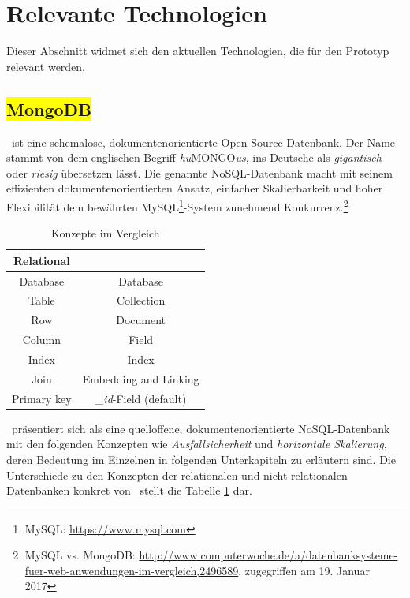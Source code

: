 \section{Relevante Technologien}

Dieser Abschnitt widmet sich den aktuellen Technologien, die für den Prototyp relevant werden.

\subsection{\colorbox{yellow}{MongoDB}}\label{mongo}

\mongo\ ist eine  schemalose, dokumentenorientierte Open-Source-Datenbank. Der Name stammt von dem englischen Begriff \textit{hu}MONGO\textit{us}, ins Deutsche als \textit{gigantisch} oder \textit{riesig} übersetzen lässt. Die genannte NoSQL-Datenbank macht mit seinem effizienten dokumentenorientierten Ansatz, einfacher Skalierbarkeit und hoher Flexibilität dem bewährten MySQL\footnote{MySQL: \url{https://www.mysql.com}}-System zunehmend Konkurrenz.\footnote{MySQL vs. MongoDB: \url{http://www.computerwoche.de/a/datenbanksysteme-fuer-web-anwendungen-im-vergleich,2496589}, zugegriffen am 19. Januar 2017} 


\newcommand*{\head}[1]{\textbf{#1}}%

\begin{table}[h]
\centering
\begin{tabular}{cc}
\toprule 
    \rowcolor{gray!50}
	Relational & \mongo\ \\
	\midrule
	Database &  Database\\
	Table & Collection\\
	Row &  Document\\
	Column &  Field\\
	Index & Index\\
	Join &  Embedding and Linking\\
	Primary key & \textit{\_id}-Field (default)\\
	\bottomrule
\end{tabular}
\caption[Konzepte im Vergleich]{Konzepte im Vergleich}
\label{table:concepts}
\end{table}

\mongo\ präsentiert sich als eine quelloffene, dokumentenorientierte NoSQL-Datenbank mit den folgenden Konzepten wie \textit{Ausfallsicherheit} und \textit{horizontale Skalierung}, deren Bedeutung im Einzelnen in folgenden Unterkapiteln zu erläutern sind.
Die Unterschiede zu den Konzepten der relationalen und nicht-relationalen Datenbanken konkret von \mongo\ stellt die Tabelle \ref{table:concepts} dar.

